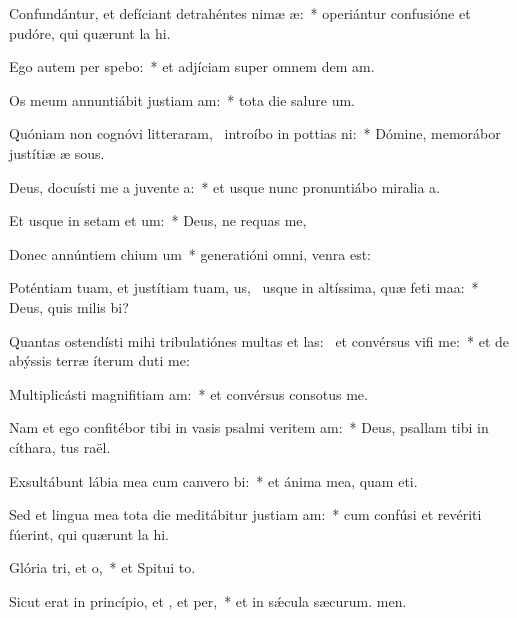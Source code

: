 \item Confundántur, et defíciant detrahéntes nimæ æ:~* operiántur confusióne et pudóre, qui quærunt la hi.
\item Ego autem per spebo:~* et adjíciam super omnem dem am.
\item Os meum annuntiábit justiam am:~* tota die salure um.
\item Quóniam non cognóvi litteraram,~\pscross{} introíbo in pottias ni:~* Dómine, memorábor justítiæ æ sous.
\item Deus, docuísti me a juvente a:~* et usque nunc pronuntiábo miralia a.
\item Et usque in setam et um:~* Deus, ne requas me,
\item Donec annúntiem chium um~* generatióni omni,  venra est:
\item Poténtiam tuam, et justítiam tuam, us,~\pscross{} usque in altíssima, quæ feti maa:~* Deus, quis milis bi?
\item Quantas ostendísti mihi tribulatiónes multas et las:~\pscross{} et convérsus vifi me:~* et de abýssis terræ íterum duti me:
\item Multiplicásti magnifitiam am:~* et convérsus consotus  me.
\item Nam et ego confitébor tibi in vasis psalmi veritem am:~* Deus, psallam tibi in cíthara, tus raël.
\item Exsultábunt lábia mea cum canvero bi:~* et ánima mea, quam eti.
\item Sed et lingua mea tota die meditábitur justiam am:~* cum confúsi et revériti fúerint, qui quærunt la hi.
\item Glória tri, et o,~* et Spitui to.
\item Sicut erat in princípio, et , et per,~* et in sǽcula sæcurum. men.
